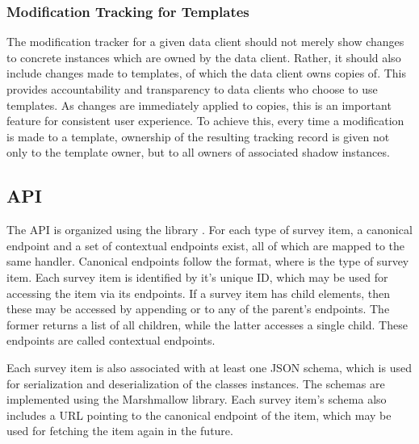     \subsubsection{Modification Tracking for Templates}
        The modification tracker for a given data client should not 
        merely show changes to concrete instances which are owned by
        the data client. Rather, it should also include changes
        made to templates, of which the data client owns copies of.
        This provides accountability and transparency to data clients
        who choose to use templates. As changes are immediately applied
        to copies, this is an important feature for consistent user
        experience. To achieve this, every time a modification
        is made to a template, ownership of the resulting tracking record 
        is given not only to the template owner, but to all
        owners of associated shadow instances.

\subsection{API}
    The API is organized using the 
    library \cite{flask-restful}. For each type of survey item, a canonical endpoint and a set of
    contextual endpoints exist, all of which are mapped to the same handler.
    Canonical endpoints follow the  format,
    where  is the type of survey item. Each survey item is identified
    by it's unique ID, which may be used for accessing the item via its endpoints.
    If a survey item has child elements, then these may be accessed by
    appending  or  to any
    of the parent's endpoints. The former returns a list of all children,
    while the latter accesses a single child. These endpoints are called
    contextual endpoints.

    Each survey item is also associated with at least one JSON schema,
    which is used for serialization and deserialization of the classes
    instances. The schemas are implemented using the Marshmallow
    library. Each survey item's schema also includes a URL pointing to
    the canonical endpoint of the item, which may be used for
    fetching the item again in the future.

